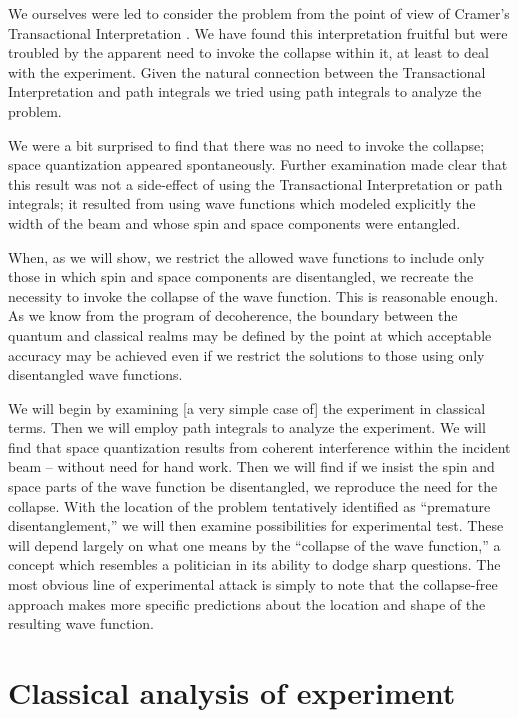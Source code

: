 \documentclass[aps,prl,superscriptaddress,12pt]{revtex4-2}
\begin{document}
We ourselves were led to consider the problem from the point of view of Cramer's Transactional Interpretation
	\cite{Cramer:1986,Cramer:1988a}. 
We have found this interpretation fruitful but were troubled by the apparent need to invoke the collapse within it,
	at least to deal with the \sg experiment.
Given the natural connection between the Transactional Interpretation and path integrals 
	we tried using path integrals to analyze the problem.

We were a bit surprised to find that there was no need to invoke the collapse; 
	space quantization appeared spontaneously. 
Further examination made clear that this result 
	was not a side-effect of using the Transactional Interpretation or path integrals; 
	it resulted from using wave functions
	which modeled explicitly the width of the beam
	and whose spin and space components were entangled. 

When, as we will show, 
	we restrict the allowed wave functions 
	to include only those in which spin and space components are disentangled, 
	we recreate the necessity to invoke the collapse of the wave function. 
This is reasonable enough. 
As we know from the program of decoherence, 
	the boundary between the quantum and classical realms 
	may be defined by the point at which acceptable accuracy may be achieved 
	even if we restrict the solutions to those using only disentangled wave functions.

We will begin by examining [a very simple case of] 
	the \sg experiment in classical terms. 
Then we will employ path integrals to analyze the experiment. 
We will find that space quantization results 
	from coherent interference within the incident beam 
	-- without need for hand work. 
Then we will find if we insist the spin and space parts of the wave function be disentangled, 
	we reproduce the need for the collapse. 
With the location of the problem tentatively identified as ``premature disentanglement,'' 
	we will then examine possibilities for experimental test. 
These will depend largely on what one means by the ``collapse of the wave function,'' 
	a concept which resembles a politician in its ability to dodge sharp questions. 
The most obvious line of experimental attack is simply to note that the collapse-free approach 
	makes more specific predictions about the location and shape of the resulting wave function.

\section{Classical analysis of \sg experiment}
\end{document}
